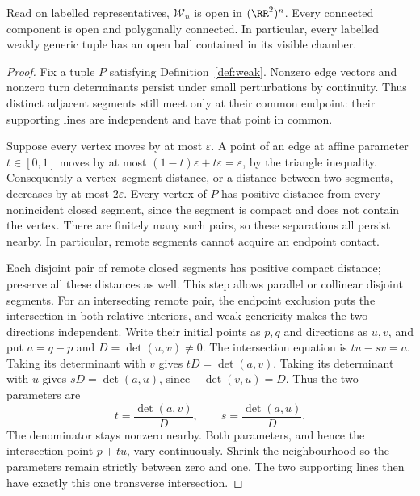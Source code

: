 \begin{lemma}\label{lem:weak-open}\leanok
Read on labelled representatives, $\mathcal W_n$ is open in
$(\RR^2)^n$. Every connected component is open and polygonally
connected. In particular, every labelled weakly generic tuple has
an open ball contained in its visible chamber.

\end{lemma}
\begin{proof}\leanok
Fix a tuple $P$ satisfying Definition~\ref{def:weak}. Nonzero edge
vectors and nonzero turn determinants persist under small perturbations
by continuity. Thus distinct adjacent segments still meet only at their common
endpoint: their supporting lines are independent and have that point
in common.

Suppose every vertex moves by at most $\varepsilon$. A point of an
edge at affine parameter $t\in[0,1]$ moves by at most
$(1-t)\varepsilon+t\varepsilon=\varepsilon$, by the triangle
inequality. Consequently a vertex--segment distance, or a distance
between two segments, decreases by at most $2\varepsilon$.
Every vertex of $P$ has positive distance from every nonincident
closed segment, since the segment is compact and does not contain
the vertex. There are finitely many such pairs, so these separations
all persist nearby. In particular, remote segments cannot acquire
an endpoint contact.

Each disjoint pair of remote closed segments has positive compact
distance; preserve all these distances as well. This step allows
parallel or collinear disjoint segments. For an intersecting remote
pair, the endpoint exclusion puts the intersection in both relative
interiors, and weak genericity makes the two directions independent.
Write their initial points as $p,q$ and directions as $u,v$, and put
$a=q-p$ and $D=\det(u,v)\neq0$. The intersection equation is
$tu-sv=a$. Taking its determinant with $v$ gives
$tD=\det(a,v)$. Taking its determinant with $u$ gives
$sD=\det(a,u)$, since $-\det(v,u)=D$. Thus the two parameters are
\begin{equation}\label{eq:weak-open-parameters}
 t=\frac{\det(a,v)}D,\qquad s=\frac{\det(a,u)}D.
\end{equation}
The denominator stays nonzero nearby. Both parameters, and hence the
intersection point $p+tu$, vary continuously. Shrink the neighbourhood
so the parameters remain strictly between zero and one. The two
supporting lines then have exactly this one transverse intersection.


\end{proof}
